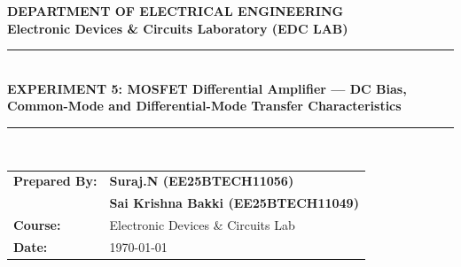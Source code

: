 \documentclass[11pt,a4paper]{article}
\begin{document}
\begin{center}
    {\LARGE \textbf{\color{primary} DEPARTMENT OF ELECTRICAL ENGINEERING}}\\[0.2cm]
    {\large \textbf{Electronic Devices \& Circuits Laboratory (EDC LAB)}}\\[0.4cm]
    \rule{\linewidth}{1pt}\\[0.3cm]
    {\Large \textbf{EXPERIMENT 5: MOSFET Differential Amplifier --- DC Bias, Common-Mode and Differential-Mode Transfer Characteristics}}\\[0.3cm]
    \rule{\linewidth}{1pt}\\[0.4cm]
    
    \begin{tabular}{ll}
        \textbf{Prepared By:} & \textbf{Suraj.N (EE25BTECH11056)} \\
                              & \textbf{Sai Krishna Bakki (EE25BTECH11049)} \\
        \textbf{Course:}      & Electronic Devices \& Circuits Lab \\
        \textbf{Date:}        & \today
    \end{tabular}
\end{center}

\vspace{0.2cm}
\end{document}
